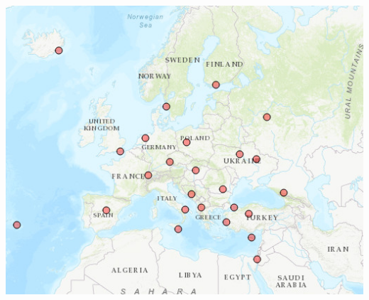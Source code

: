 \documentclass[landscape,a0paper,fontscale=0.346]{baposter} %
\begin{document}
\begin{poster}
{  \begin{center}
    \includegraphics[width=.7\textwidth]{igs.png}
  \end{center}

 
}


\end{poster}
\end{document}
